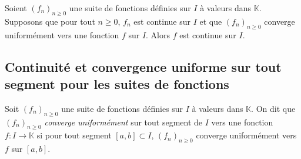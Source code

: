 \documentclass[french,11pt,twoside]{VcCours}
\begin{document}
\begin{Demonstration}{} 
\newpage

\vspace*{10cm}
\end{Demonstration}

\begin{Corollaire}{}
Soient $(f_n)_{n \geq 0}$ une suite de fonctions définies sur $I$ à valeurs dans $\mathbb{K}$. Supposons que pour tout $n \geq 0$, $f_n$ est continue sur $I$ et que $(f_n)_{n \geq 0}$ converge uniformément vers une fonction $f$ sur $I$. Alors $f$ est continue sur $I$.
\end{Corollaire}


\subsection{Continuité et convergence uniforme sur tout segment pour les suites de fonctions}

\begin{Definition}{} Soit $(f_n)_{n \geq 0}$ une suite de fonctions définies sur $I$ à valeurs dans $\mathbb{K}$. On dit que $(f_n)_{n \geq 0}$ \emph{converge uniformément} sur tout segment de $I$ vers une fonction $f : I \rightarrow \mathbb{K}$ si pour tout segment $[a,b] \subset I$, $(f_n)_{n \geq 0}$ converge uniformément vers $f$ sur $[a,b]$.
\end{Definition} 
\end{document}
